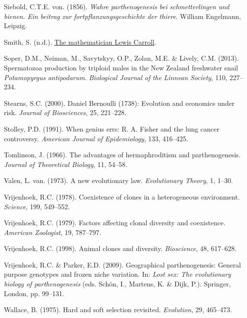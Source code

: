 \documentclass[
  letterpaper,
]{book}
\newlength{\cslhangindent}
\newenvironment{CSLReferences}[2] %
 {\begin{list}{}{%
  \setlength{\itemindent}{0pt}
  \setlength{\leftmargin}{0pt}
  \setlength{\parsep}{0pt}
  \ifodd #1
   \setlength{\leftmargin}{\cslhangindent}
   \setlength{\itemindent}{-1\cslhangindent}
  \fi
  \setlength{\itemsep}{#2\baselineskip}}}
 {\end{list}}
\begin{document}
\begin{CSLReferences}{1}{0}
Siebold, C.T.E. von. (1856). \emph{Wahre parthenogenesis bei
schmetterlingen und bienen. Ein beitrag zur fortpflanzungsgeschichte der
thiere}. William Engelmann, Leipzig.

Smith, S. (n.d.).
\href{http://www.herkimershideaway.org/writings/carroll.htm}{The
mathematician {Lewis Carroll}}.

Soper, D.M., Neiman, M., Savytskyy, O.P., Zolan, M.E. \& Lively, C.M.
(2013). Spermatozoa production by triploid males in the {New Zealand}
freshwater snail \emph{{P}otamopyrgus antipodarum}. \emph{Biological
Journal of the Linnean Society}, 110, 227--234.

Stearns, S.C. (2000). {Daniel Bernoulli} (1738): Evolution and economics
under risk. \emph{Journal of Biosciences}, 25, 221--228.

Stolley, P.D. (1991). When genius errs: R. A. Fisher and the lung cancer
controversy. \emph{American Journal of Epidemiology}, 133, 416--425.

Tomlinson, J. (1966). The advantages of hermaphroditism and
parthenogenesis. \emph{Journal of Theoretical Biology}, 11, 54--58.

Valen, L. van. (1973). A new evolutionary law. \emph{Evolutionary
Theory}, 1, 1--30.

Vrijenhoek, R.C. (1978). Coexistence of clones in a heterogeneous
environment. \emph{Science}, 199, 549--552.

Vrijenhoek, R.C. (1979). Factors affecting clonal diversity and
coexistence. \emph{American Zoologist}, 19, 787--797.

Vrijenhoek, R.C. (1998). Animal clones and diversity. \emph{Bioscience},
48, 617--628.

Vrijenhoek, R.C. \& Parker, E.D. (2009). Geographical parthenogenesis:
General purpose genotypes and frozen niche variation. In: \emph{Lost
sex: The evolutionary biology of parthenogenesis} (eds. Schön, I.,
Martens, K. \& Dijk, P.). Springer, London, pp. 99--131.

Wallace, B. (1975). Hard and soft selection revisited. \emph{Evolution},
29, 465--473.


\end{CSLReferences}
\end{document}
